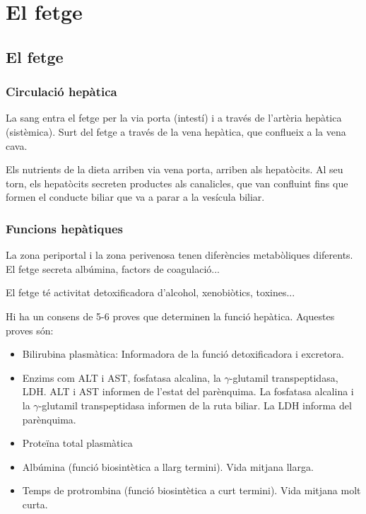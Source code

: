 \section{El fetge}
\label{sec:el-fetge}

\subsection{El fetge}
\label{sec:el-fetge-1}

\subsubsection{Circulació hepàtica}
\label{sec:circulacio-hepatica}
La sang entra el fetge per la via porta (intestí) i a través de
l'artèria hepàtica (sistèmica). Surt del fetge a través de la vena
hepàtica, que conflueix a la vena cava.

Els nutrients de la dieta arriben via vena porta, arriben als
hepatòcits. Al seu torn, els hepatòcits secreten productes als
canalicles, que van confluint fins que formen el conducte biliar que
va a  parar a la vesícula biliar.

\subsubsection{Funcions hepàtiques}
\label{sec:funcions-hepatiques}
La zona periportal i la zona perivenosa tenen diferències metabòliques
diferents. El fetge secreta albúmina, factors de coagulació...

El fetge té activitat detoxificadora d'alcohol, xenobiòtics, toxines... 

Hi ha un consens de 5-6 proves que determinen la funció
hepàtica. Aquestes proves són:
\begin{itemize}
\item Bilirubina plasmàtica: Informadora de la funció detoxificadora i
  excretora.

\item Enzims com ALT i AST, fosfatasa alcalina, la $\gamma$-glutamil
  transpeptidasa, LDH. ALT i AST informen de l'estat del
  parènquima. La fosfatasa alcalina i la $\gamma$-glutamil
  transpeptidasa informen de la ruta biliar. La LDH informa del
  parènquima.

\item Proteïna total plasmàtica

\item Albúmina (funció biosintètica a llarg termini). Vida mitjana
  llarga.
 
\item Temps de protrombina (funció biosintètica a curt termini). Vida
  mitjana molt curta.
\end{itemize}

